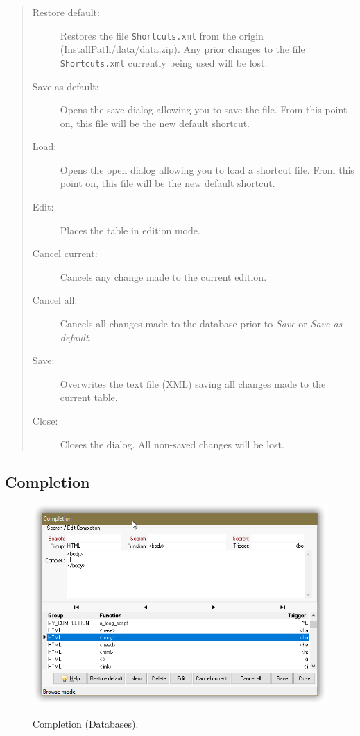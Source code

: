 \begin{quote}
  \begin{footnotesize}
    \begin{description}
      \item[Restore default:]
        Restores the file \texttt{Shortcuts.xml} from the origin
        (InstallPath/data/data.zip). Any prior changes to the file
        \texttt{Shortcuts.xml} currently being used will be lost.
      \item[Save as default:]
        Opens the save dialog allowing you to save the file. From
        this point on, this file will be the new default shortcut.
      \item[Load:]
        Opens the open dialog allowing you to load a shortcut file.
        From this point on, this file will be the new default shortcut.
      \item[Edit:]
        Places the table in edition mode.
      \item[Cancel current:]
        Cancels any change made to the current edition.
      \item[Cancel all:]
        Cancels all changes made to the database prior to \textit{Save} or \textit{Save as default}.
      \item[Save:]
        Overwrites the text file (XML) saving all changes made to the current table.
      \item[Close:]
        Closes the dialog. All non-saved changes will be lost.
    \end{description}
  \end{footnotesize}
\end{quote}


\subsection{Completion}

\begin{figure}[H]
  \includegraphics[scale=0.35]{./res/completion_dlg.png}\\
  \caption{Completion (Databases).}
  \label{fig:completion_dlg}
\end{figure}


